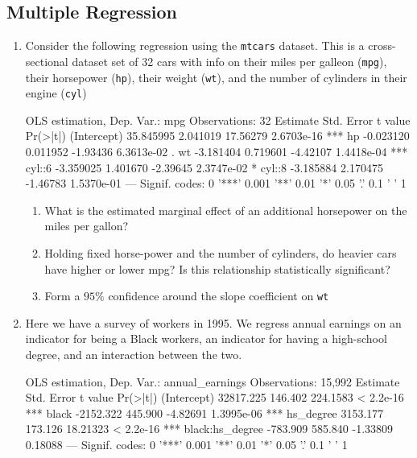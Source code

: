 \documentclass[12pt]{article}
\begin{document}
\subsection*{Multiple Regression}
\begin{enumerate}
  \item Consider the following regression using the \texttt{mtcars} dataset. This is a cross-sectional dataset set of 32 cars with info on their miles per galleon (\texttt{mpg}), their horsepower (\texttt{hp}), their weight (\texttt{wt}), and the number of cylinders in their engine (\texttt{cyl}) 

  \begin{codeblock}[{}]
OLS estimation, Dep. Var.: mpg
Observations: 32
             Estimate  Std. Error   t value    Pr(>|t|)    
(Intercept) 35.845995    2.041019  17.56279  2.6703e-16 ***
hp          -0.023120    0.011952  -1.93436  6.3613e-02 .  
wt          -3.181404    0.719601  -4.42107  1.4418e-04 ***
cyl::6      -3.359025    1.401670  -2.39645  2.3747e-02 *  
cyl::8      -3.185884    2.170475  -1.46783  1.5370e-01    
---
Signif. codes:  0 '***' 0.001 '**' 0.01 '*' 0.05 '.' 0.1 ' ' 1
  \end{codeblock}

  \begin{enumerate}
    \item What is the estimated marginal effect of an additional horsepower on the miles per gallon?
    
    \item Holding fixed horse-power and the number of cylinders, do heavier cars have higher or lower mpg? Is this relationship statistically significant?
    
    \item Form a $95\%$ confidence around the slope coefficient on \texttt{wt}
  \end{enumerate}
  
  \item Here we have a survey of workers in 1995. We regress annual earnings on an indicator for being a Black workers, an indicator for having a high-school degree, and an interaction between the two.
  
  \begin{codeblock}[{}]
OLS estimation, Dep. Var.: annual_earnings
Observations: 15,992 
                 Estimate  Std. Error   t value    Pr(>|t|)    
(Intercept)     32817.225     146.402  224.1583   < 2.2e-16 ***
black           -2152.322     445.900  -4.82691  1.3995e-06 ***
hs_degree        3153.177     173.126  18.21323   < 2.2e-16 ***
black:hs_degree  -783.909     585.840  -1.33809     0.18088    
---
Signif. codes:  0 '***' 0.001 '**' 0.01 '*' 0.05 '.' 0.1 ' ' 1
  \end{codeblock}


\end{enumerate}
\end{document}
